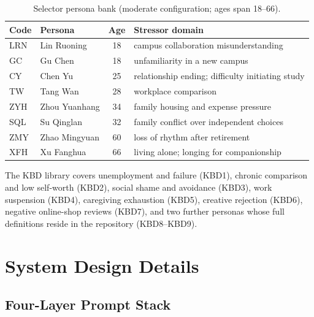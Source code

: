 \documentclass[10pt]{article}
\begin{document}
\begin{table}[h]
\centering
\caption{Selector persona bank (moderate configuration; ages span 18--66).}
\label{tab:personas}
\small
\begin{tabular}{@{}llcl@{}}
\toprule
Code & Persona & Age & Stressor domain \\
\midrule
LRN & Lin Ruoning & 18 & campus collaboration misunderstanding \\
GC  & Gu Chen & 18 & unfamiliarity in a new campus \\
CY  & Chen Yu & 25 & relationship ending; difficulty initiating study \\
TW  & Tang Wan & 28 & workplace comparison \\
ZYH & Zhou Yuanhang & 34 & family housing and expense pressure \\
SQL & Su Qinglan & 32 & family conflict over independent choices \\
ZMY & Zhao Mingyuan & 60 & loss of rhythm after retirement \\
XFH & Xu Fanghua & 66 & living alone; longing for companionship \\
\bottomrule
\end{tabular}
\end{table}

The KBD library covers unemployment and failure (KBD1), chronic comparison and low self-worth (KBD2), social shame and avoidance (KBD3), work suspension (KBD4), caregiving exhaustion (KBD5), creative rejection (KBD6), negative online-shop reviews (KBD7), and two further personas whose full definitions reside in the repository (KBD8--KBD9).

\section{System Design Details}\label{app:details}

\subsection{Four-Layer Prompt Stack}
\end{document}
